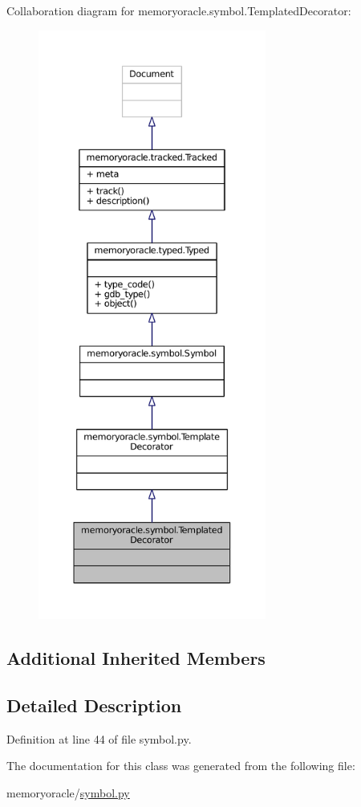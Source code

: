 Collaboration diagram for memoryoracle.\+symbol.\+Templated\+Decorator\+:
\nopagebreak
\begin{figure}[H]
\begin{center}
\leavevmode
\includegraphics[height=550pt]{classmemoryoracle_1_1symbol_1_1TemplatedDecorator__coll__graph}
\end{center}
\end{figure}
\subsection*{Additional Inherited Members}


\subsection{Detailed Description}


Definition at line 44 of file symbol.\+py.



The documentation for this class was generated from the following file\+:\begin{DoxyCompactItemize}
\item 
memoryoracle/\hyperlink{symbol_8py}{symbol.\+py}\end{DoxyCompactItemize}
